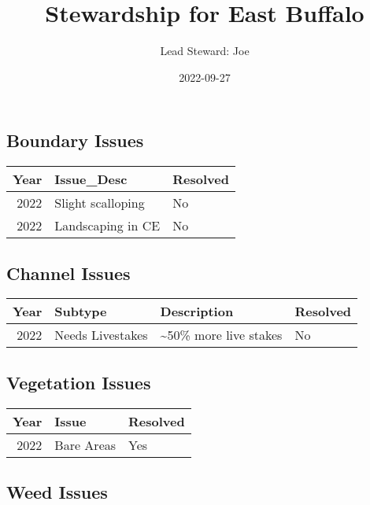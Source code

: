 \documentclass[
  landscape]{article}
\title{Stewardship for East Buffalo}
\author{Lead Steward: Joe}
\date{2022-09-27}
\begin{document}
\maketitle

\hypertarget{boundary-issues}{%
\subsection{Boundary Issues}\label{boundary-issues}}

\begin{longtable}[]{@{}rll@{}}
\toprule()
Year & Issue\_Desc & Resolved \\
\midrule()
\endhead
2022 & Slight scalloping & No \\
2022 & Landscaping in CE & No \\
\bottomrule()
\end{longtable}

\hypertarget{channel-issues}{%
\subsection{Channel Issues}\label{channel-issues}}

\begin{longtable}[]{@{}rlll@{}}
\toprule()
Year & Subtype & Description & Resolved \\
\midrule()
\endhead
2022 & Needs Livestakes & \textasciitilde50\% more live stakes & No \\
\bottomrule()
\end{longtable}

\newpage

\hypertarget{vegetation-issues}{%
\subsection{Vegetation Issues}\label{vegetation-issues}}

\begin{longtable}[]{@{}rll@{}}
\toprule()
Year & Issue & Resolved \\
\midrule()
\endhead
2022 & Bare Areas & Yes \\
\bottomrule()
\end{longtable}

\newpage

\hypertarget{weed-issues}{%
\subsection{Weed Issues}\label{weed-issues}}
\end{document}
